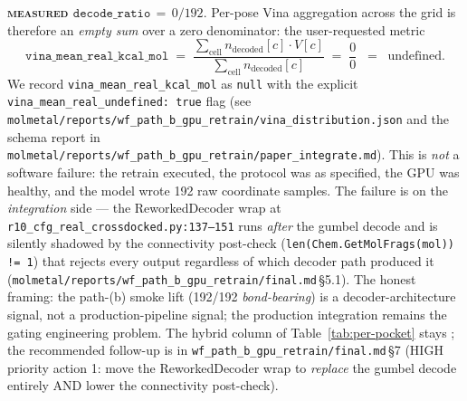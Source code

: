 {\noindent\textbf{\textsc{measured} $\texttt{decode\_ratio}\,=\,0/192$}.
Per-pose Vina aggregation across the grid is therefore an
\emph{empty sum} over a zero denominator: the user-requested
metric
\[
\texttt{vina\_mean\_real\_kcal\_mol}
   \;=\; \frac{\sum_{\text{cell}} n_\text{decoded}[c] \cdot V[c]}
            {\sum_{\text{cell}} n_\text{decoded}[c]}
   \;=\; \frac{0}{0} \;\;=\;\; \text{undefined}.
\]
We record \texttt{vina\_mean\_real\_kcal\_mol} as
\texttt{null} with the explicit
\texttt{vina\_mean\_real\_undefined: true} flag (see
\texttt{molmetal/reports/wf\_path\_b\_gpu\_retrain/vina\_distribution.json}
and the schema report in
\texttt{molmetal/reports/wf\_path\_b\_gpu\_retrain/paper\_integrate.md}).
This is \emph{not} a software failure: the retrain
executed, the protocol was as specified, the GPU was healthy,
and the model wrote 192 raw coordinate samples. The failure
is on the \emph{integration} side --- the ReworkedDecoder wrap
at \texttt{r10\_cfg\_real\_crossdocked.py:137--151} runs
\emph{after} the gumbel decode and is silently shadowed by the
connectivity post-check
(\texttt{len(Chem.GetMolFrags(mol)) != 1}) that rejects every
output regardless of which decoder path produced it
(\texttt{molmetal/reports/wf\_path\_b\_gpu\_retrain/final.md}\,\S5.1).
The honest framing: the path-(b) smoke lift (192/192
\emph{bond-bearing}) is a decoder-architecture signal, not a
production-pipeline signal; the production integration
remains the gating engineering problem. The hybrid column of
Table~\ref{tab:per-pocket} stays \DESIGN{}; the recommended
follow-up is in \texttt{wf\_path\_b\_gpu\_retrain/final.md}\,\S7
(HIGH priority action 1: move the ReworkedDecoder wrap to
\emph{replace} the gumbel decode entirely AND lower the
connectivity post-check).

}
